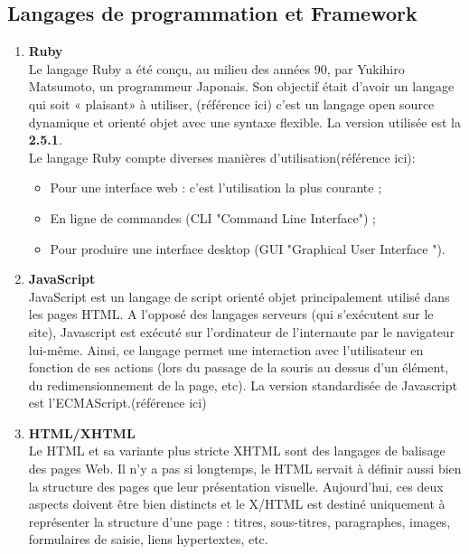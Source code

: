 \documentclass[13pt,openany]{report}%
\begin{document}
	\subsection{Langages de programmation et Framework}
 \begin{enumerate}
 	\item \textbf{Ruby}\\
 	Le langage Ruby a été conçu, au milieu des années 90, par Yukihiro Matsumoto, un
 	programmeur Japonais. Son objectif était d’avoir un langage qui soit « plaisant» à
 	utiliser, (référence ici) c'est un langage open source dynamique et orienté objet avec une syntaxe flexible. La version utilisée est la \textbf{2.5.1}.\\
 	
 \indent	Le langage Ruby compte diverses manières d’utilisation(référence ici):
 	\begin{itemize}
 		\item Pour une interface web : c’est l’utilisation la plus courante ;
 		\item En ligne de commandes (CLI "Command Line Interface") ;
 		\item Pour produire une interface desktop (GUI "Graphical User Interface ").\\
 	\end{itemize}
   	\item \textbf{JavaScript}\\
   	JavaScript est un langage de script orienté objet principalement utilisé dans les pages HTML.
   	A l’opposé des langages serveurs (qui s’exécutent sur le site), Javascript est exécuté sur l’ordinateur de l’internaute par le navigateur lui-même. Ainsi, ce langage permet une interaction
   	avec l’utilisateur en fonction de ses actions (lors du passage de la souris au dessus d’un élément,
   	du redimensionnement de la page, etc). La version standardisée de Javascript est l’ECMAScript.(référence ici)\\
   	\item \textbf{HTML/XHTML}\\
   	 Le HTML et sa variante plus stricte XHTML sont des langages de balisage 
   	des   pages  Web.  Il  n’y  a  pas  si  longtemps,  le  HTML  servait  à  définir  aussi  bien  la 
   	structure des pages que leur présentation visuelle. Aujourd'hui, ces deux aspects doivent 
   	être bien distincts et le X/HTML est destiné uniquement à représenter la structure d’une 
   	page : titres, sous-titres, paragraphes, images, formulaires de saisie, liens hypertextes, 
   	etc.\\
   	

\end{enumerate}
\end{document}
